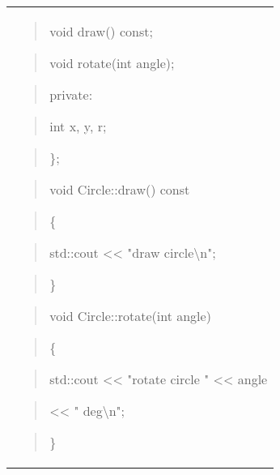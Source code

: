 \documentclass[
]{article}
\begin{document}
\begin{longtable}[]{@{}
  >{\raggedright\arraybackslash}p{}@{}}
\begin{quote}
void draw() const;
\end{quote}

\begin{quote}
void rotate(int angle);
\end{quote}

\begin{quote}
private:
\end{quote}

\begin{quote}
int x, y, r;
\end{quote}

\begin{quote}
\};
\end{quote}

\begin{quote}
\end{quote}

\begin{quote}
void Circle::draw() const
\end{quote}

\begin{quote}
\{
\end{quote}

\begin{quote}
std::cout \textless\textless{} "draw circle\textbackslash n";
\end{quote}

\begin{quote}
\}
\end{quote}

\begin{quote}
\end{quote}

\begin{quote}
void Circle::rotate(int angle)
\end{quote}

\begin{quote}
\{
\end{quote}

\begin{quote}
std::cout \textless\textless{} "rotate circle " \textless\textless{}
angle
\end{quote}

\begin{quote}
\textless\textless{} " deg\textbackslash n";
\end{quote}

\begin{quote}
\}
\end{quote}


\end{longtable}
\end{document}
